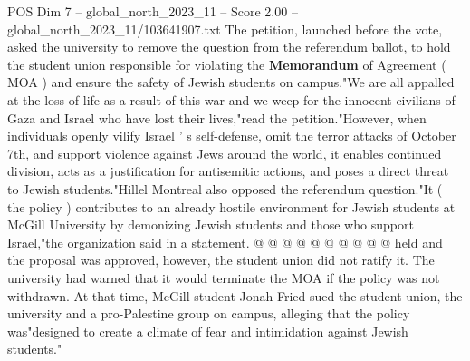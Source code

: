 \begin{textsample}{POS Dim 7 – global\_north\_2023\_11 – Score 2.00 – global\_north\_2023\_11/103641907.txt}
The petition, launched before the vote, asked the university to remove the question from the referendum ballot, to hold the student union responsible for violating the \textbf{Memorandum} of Agreement ( MOA ) and ensure the safety of Jewish students on campus."We are all appalled at the loss of life as a result of this war and we weep for the innocent civilians of Gaza and Israel who have lost their lives,"read the petition."However, when individuals openly vilify Israel ' s self-defense, omit the terror attacks of October 7th, and support violence against Jews around the world, it enables continued division, acts as a justification for antisemitic actions, and poses a direct threat to Jewish students."Hillel Montreal also opposed the referendum question."It ( the policy ) contributes to an already hostile environment for Jewish students at McGill University by demonizing Jewish students and those who support Israel,"the organization said in a statement. @ @ @ @ @ @ @ @ @ @ held and the proposal was approved, however, the student union did not ratify it.
The university had warned that it would terminate the MOA if the policy was not withdrawn.
At that time, McGill student Jonah Fried sued the student union, the university and a pro-Palestine group on campus, alleging that the policy was"designed to create a climate of fear and intimidation against Jewish students."

\end{textsample}
